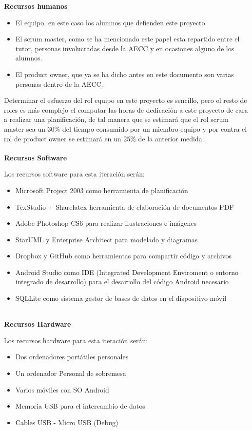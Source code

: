 \documentclass[../pfc.tex]{subfiles}
\begin{document}
	\textbf{Recursos humanos}
	
	\begin{itemize} 
		\item El equipo, en este caso los alumnos que defienden este proyecto. 
		\item El scrum master, como se ha mencionado este papel esta repartido entre el tutor, personas involucradas desde la AECC y en ocasiones alguno de los alumnos. 
		\item El product owner, que ya se ha dicho antes en este documento son varias personas dentro de la AECC. 
	\end{itemize}
	
	Determinar el esfuerzo del rol equipo en este proyecto es sencillo, pero el resto de roles es más complejo el computar las horas de dedicación a este proyecto de cara a realizar una planificación, de tal manera que se estimará que el rol scrum master sea un 30\% del tiempo consumido por un miembro equipo y por contra el rol de product owner se estimará en un 25\% de la anterior medida.\\\\
	
	\textbf{Recursos Software}
	
	Los recursos software para esta iteración serán:
	\begin{itemize}
		\item Microsoft Project 2003 como herramienta de planificación
		\item TexStudio + Sharelatex herramienta de elaboración de documentos PDF
		\item Adobe Photoshop CS6 para realizar ilustraciones e imágenes
		\item StarUML y Enterprise Architect para modelado y diagramas
		\item Dropbox y GitHub como herramientas para compartir código y archivos
		\item Android Studio como IDE (Integrated Development Enviroment o entorno integrado de desarrollo) para el desarrollo del código Android necesario
		\item SQLLite como sistema gestor de bases de datos en el dispositivo móvil\\\\
	\end{itemize}
	
	\textbf{Recursos Hardware}
	
	Los recursos hardware para esta iteración serán:
	
	\begin{itemize}
		\item Dos ordenadores portátiles personales
		\item Un ordenador Personal de sobremesa
		\item Varios móviles con SO Android
		\item Memoria USB para el intercambio de datos
		\item Cables USB - Micro USB (Debug)
	\end{itemize}	
	
\end{document}
